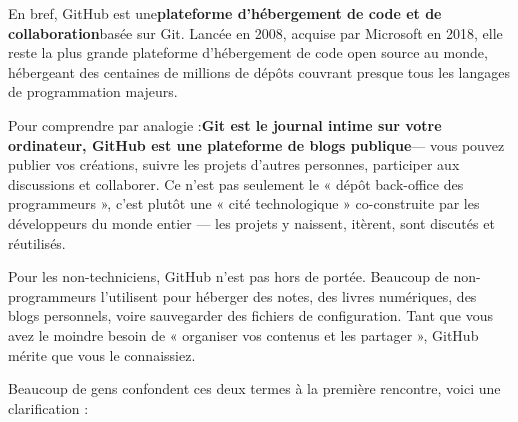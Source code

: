 


En bref, GitHub est une\textbf{plateforme d’hébergement de code et de collaboration}basée sur Git. Lancée en 2008, acquise par Microsoft en 2018, elle reste la plus grande plateforme d’hébergement de code open source au monde, hébergeant des centaines de millions de dépôts couvrant presque tous les langages de programmation majeurs.

Pour comprendre par analogie :\textbf{Git est le journal intime sur votre ordinateur, GitHub est une plateforme de blogs publique}— vous pouvez publier vos créations, suivre les projets d’autres personnes, participer aux discussions et collaborer. Ce n’est pas seulement le « dépôt back-office des programmeurs », c’est plutôt une « cité technologique » co-construite par les développeurs du monde entier — les projets y naissent, itèrent, sont discutés et réutilisés.

Pour les non-techniciens, GitHub n'est pas hors de portée. Beaucoup de non-programmeurs l'utilisent pour héberger des notes, des livres numériques, des blogs personnels, voire sauvegarder des fichiers de configuration. Tant que vous avez le moindre besoin de « organiser vos contenus et les partager », GitHub mérite que vous le connaissiez.


Beaucoup de gens confondent ces deux termes à la première rencontre, voici une clarification :

